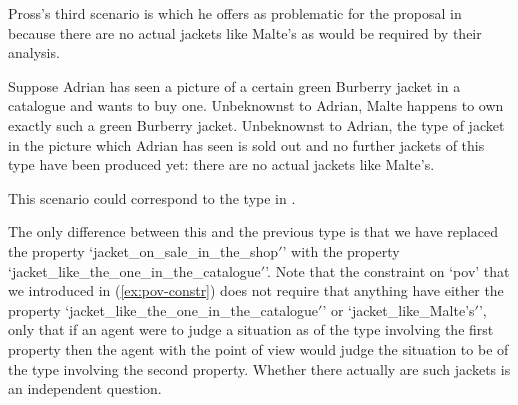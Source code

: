 Pross's third scenario is \nexteg{} which he offers as problematic for
the proposal in \cite{FintelHeim2011} because there are no actual
jackets like Malte's as would be required by their analysis.
\begin{ex} 
Suppose Adrian has seen a picture of a certain green Burberry jacket in a catalogue and wants to buy one. Unbeknownst to Adrian, Malte happens
to own exactly such a green Burberry jacket. Unbeknownst to Adrian, the type of jacket in the picture which Adrian has seen is sold out and no further jackets of this type have been produced yet: there are no actual jackets like Malte's. 
\end{ex} 
This scenario could correspond to the type in \nexteg{}.
\begin{ex} 
\end{ex} 
The only difference between this and the previous type is that we have
replaced the property `jacket\_on\_sale\_in\_the\_shop$'$' with the
property `jacket\_like\_the\_one\_in\_the\_catalogue$'$'.  Note that the constraint on
`pov' that we introduced in (\ref{ex:pov-constr}) does not require
that anything have either the property
`jacket\_like\_the\_one\_in\_the\_catalogue$'$' or `jacket\_like\_Malte's$'$', only that if  an agent were to judge a
situation as of the type involving the first property then the agent with the point of view would
judge the situation to be of the type involving the second property.
Whether there actually are such jackets is an independent question.  

